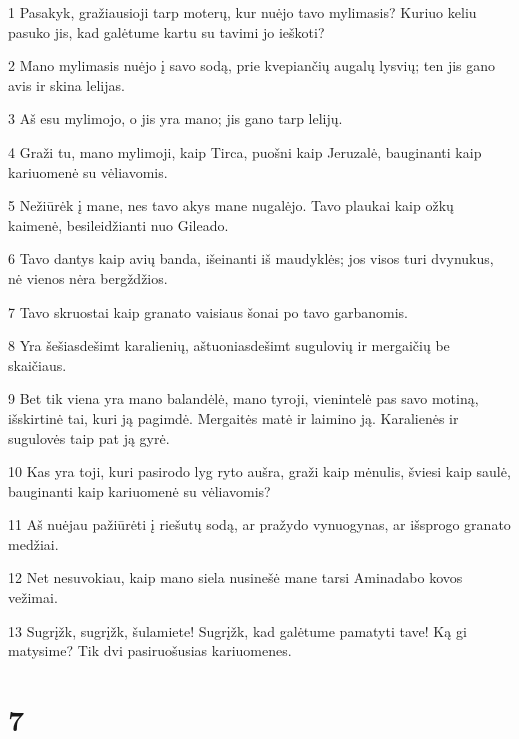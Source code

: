 \par 1 Pasakyk, gražiausioji tarp moterų, kur nuėjo tavo mylimasis? Kuriuo keliu pasuko jis, kad galėtume kartu su tavimi jo ieškoti? 
\par 2 Mano mylimasis nuėjo į savo sodą, prie kvepiančių augalų lysvių; ten jis gano avis ir skina lelijas. 
\par 3 Aš esu mylimojo, o jis yra mano; jis gano tarp lelijų. 
\par 4 Graži tu, mano mylimoji, kaip Tirca, puošni kaip Jeruzalė, bauginanti kaip kariuomenė su vėliavomis. 
\par 5 Nežiūrėk į mane, nes tavo akys mane nugalėjo. Tavo plaukai kaip ožkų kaimenė, besileidžianti nuo Gileado. 
\par 6 Tavo dantys kaip avių banda, išeinanti iš maudyklės; jos visos turi dvynukus, nė vienos nėra bergždžios. 
\par 7 Tavo skruostai kaip granato vaisiaus šonai po tavo garbanomis. 
\par 8 Yra šešiasdešimt karalienių, aštuoniasdešimt sugulovių ir mergaičių be skaičiaus. 
\par 9 Bet tik viena yra mano balandėlė, mano tyroji, vienintelė pas savo motiną, išskirtinė tai, kuri ją pagimdė. Mergaitės matė ir laimino ją. Karalienės ir sugulovės taip pat ją gyrė. 
\par 10 Kas yra toji, kuri pasirodo lyg ryto aušra, graži kaip mėnulis, šviesi kaip saulė, bauginanti kaip kariuomenė su vėliavomis? 
\par 11 Aš nuėjau pažiūrėti į riešutų sodą, ar pražydo vynuogynas, ar išsprogo granato medžiai. 
\par 12 Net nesuvokiau, kaip mano siela nusinešė mane tarsi Aminadabo kovos vežimai. 
\par 13 Sugrįžk, sugrįžk, šulamiete! Sugrįžk, kad galėtume pamatyti tave! Ką gi matysime? Tik dvi pasiruošusias kariuomenes.



\chapter{7}


